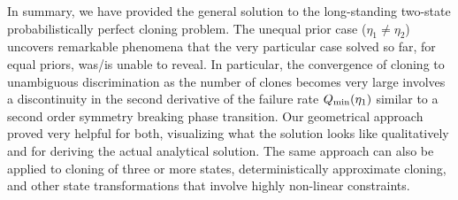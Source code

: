 \documentclass[aps,prl,twocolumn,showpacs]{revtex4}
\begin{document}

%
%  

{\color{red}In summary, we have provided the general solution to the long-standing two-state probabilistically perfect cloning problem. %
The unequal prior case ($\eta_1\not=\eta_2$) uncovers remarkable phenomena that the very particular case solved so far, for equal priors, was/is unable to reveal. In particular, the convergence of cloning to unambiguous discrimination as the number of clones becomes very large involves a discontinuity in the second derivative of the failure rate $Q_{\rm min}(\eta_1)$ similar to a second order symmetry breaking phase transition.
%
Our geometrical approach proved very helpful for both, visualizing what the solution looks like qualitatively and for deriving the actual analytical solution. The same approach can also be applied to cloning of three or more states, deterministically approximate cloning, and other state transformations that involve highly non-linear constraints.

 
}
\end{document}
